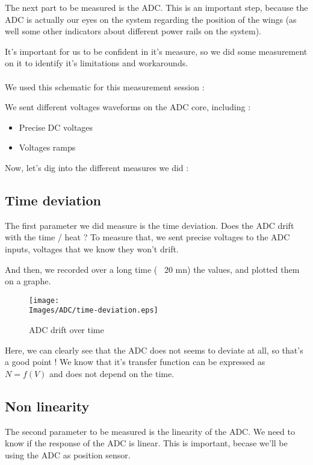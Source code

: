 The next part to be measured is the ADC. This is an important step, because the ADC is actually
our eyes on the system regarding the position of the wings (as well some other indicators about
different power rails on the system).

It's important for us to be confident in it's measure, so we did some measurement on it to identify
it's limitations and workarounds.

\paragraph{}
We used this schematic for this measurement session :


We sent different voltages waveforms on the ADC core, including :

\begin{itemize}
    \item Precise DC voltages
    \item Voltages ramps
\end{itemize}

Now, let's dig into the different measures we did :

\FloatBarrier
\subsection{Time deviation}
The first parameter we did measure is the time deviation. Does the ADC drift with the time / heat ?
To measure that, we sent precise voltages to the ADC inputs, voltages that we know they won't drift.

And then, we recorded over a long time (~ 20 mn) the values, and plotted them on a graphe.

\begin{figure}[!hbt]
    \centering
    \texttt{[image: \\Images/ADC/time-deviation.eps]}
    \caption{ADC drift over time}
\end{figure}
\FloatBarrier

Here, we can clearly see that the ADC does not seems to deviate at all, so that's a good point ! We
know that it's transfer function can be expressed as $N = f(V)$ and does not depend on the time.

\FloatBarrier
\subsection{Non linearity}
The second parameter to be measured is the linearity of the ADC. We need to know if the response of
the ADC is linear. This is important, becase we'll be using the ADC as position sensor.

